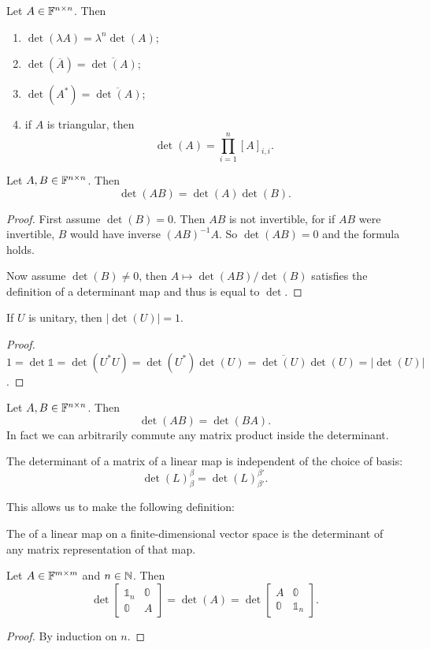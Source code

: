 \begin{lemma}
Let $A\in\mathbb{F}^{n\times n}$. Then
\begin{enumerate}
\item $\det(\lambda A) = \lambda^n\det(A)$;
\item $\det(\overline{A}) = \overline{\det(A)}$;
\item $\det(A^*) = \overline{\det(A)}$;
\item if $A$ is triangular, then
\[ \det(A) = \prod_{i=1}^n [A]_{i,i}. \]
\end{enumerate}
\end{lemma}

\begin{proposition}
Let $A,B\in\mathbb{F}^{n\times n}$. Then
\[ \det(AB) = \det(A)\det(B). \]
\end{proposition}
\begin{proof}
First assume $\det(B) = 0$. Then $AB$ is not invertible, for if $AB$ were invertible, $B$ would have inverse $(AB)^{-1}A$. So $\det(AB) = 0$ and the formula holds.

Now assume $\det(B) \neq 0$, then $A\mapsto \det(AB)/\det(B)$ satisfies the definition of a determinant map and thus is equal to $\det$.
\end{proof}
\begin{corollary}
If $U$ is unitary, then $|\det(U)| = 1$.
\end{corollary}
\begin{proof}
$1=\det{\mathbb{1}} = \det(U^*U) = \det(U^*)\det(U) = \overline{\det(U)}\det(U) = |\det(U)|$.
\end{proof}
\begin{corollary}
Let $A,B\in\mathbb{F}^{n\times n}$. Then
\[ \det(AB) = \det(BA). \]
In fact we can arbitrarily commute any matrix product inside the determinant.
\end{corollary}
\begin{corollary}
The determinant of a matrix of a linear map is independent of the choice of basis:
\[ \det(L)_{\beta}^{\beta} = \det(L)_{\beta'}^{\beta'}. \]
\end{corollary}
This allows us to make the following definition:
\begin{definition}
The  of a linear map on a finite-dimensional vector space is the determinant of any matrix representation of that map.
\end{definition}

\begin{lemma}
Let $A\in\mathbb{F}^{m\times m}$ and $n\in\mathbb{N}$. Then
\[ \det\begin{bmatrix}
\mathbb{1}_n & \mathbb{0} \\ \mathbb{0} & A
\end{bmatrix} = \det(A) = \det\begin{bmatrix}
A & \mathbb{0} \\ \mathbb{0} & \mathbb{1}_n
\end{bmatrix}. \]
\end{lemma}
\begin{proof}
By induction on $n$.
\end{proof}

